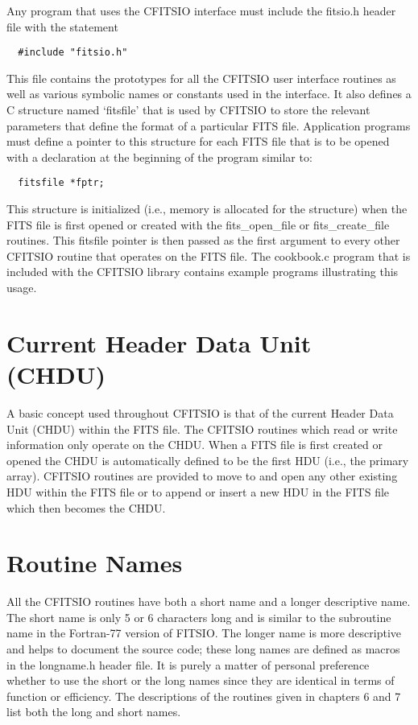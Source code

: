 Any program that uses the CFITSIO interface must include the fitsio.h
header file with the statement

\begin{verbatim}
  #include "fitsio.h"
\end{verbatim}
This file contains the prototypes for
all the CFITSIO user interface routines as well as various symbolic
names or constants used in the interface.  It also defines a C
structure named `fitsfile' that is used by CFITSIO to store the
relevant parameters that define the format of a particular FITS file.
Application programs must define a pointer to this structure for each
FITS file that is to be opened with a declaration
at the beginning of the program similar to:

\begin{verbatim}
  fitsfile *fptr;
\end{verbatim}
This structure is initialized (i.e., memory is allocated
for the structure) when the FITS file is first opened or created
with the fits\_open\_file or fits\_create\_file routines.  This fitsfile
pointer is then passed as the first argument to every other CFITSIO
routine that operates on the FITS file.  The cookbook.c program
that is included with the CFITSIO library contains example programs
illustrating this usage.


\section{Current Header Data Unit (CHDU)}

A basic concept used throughout CFITSIO is that of the current Header
Data Unit (CHDU) within the FITS file. The CFITSIO routines which read
or write information only operate on the CHDU.  When a FITS file is first
created or opened the CHDU is automatically defined to be the first HDU
(i.e., the primary array).  CFITSIO routines are provided to move
to and open any other existing HDU within the FITS file or to append or
insert a new HDU in the FITS file which then becomes the CHDU.


\section{Routine Names}

All the CFITSIO routines have both a short name and a longer
descriptive name.  The short name is only 5 or 6 characters long and is
similar to the subroutine name in the Fortran-77 version of FITSIO.
The longer name is more descriptive and helps to document the source
code; these long names are defined as macros in the longname.h header
file.  It is purely a matter of personal preference whether to use the
short or the long names since they are identical in terms of function
or efficiency.  The descriptions of the routines given in chapters 6
and 7 list both the long and short names.


